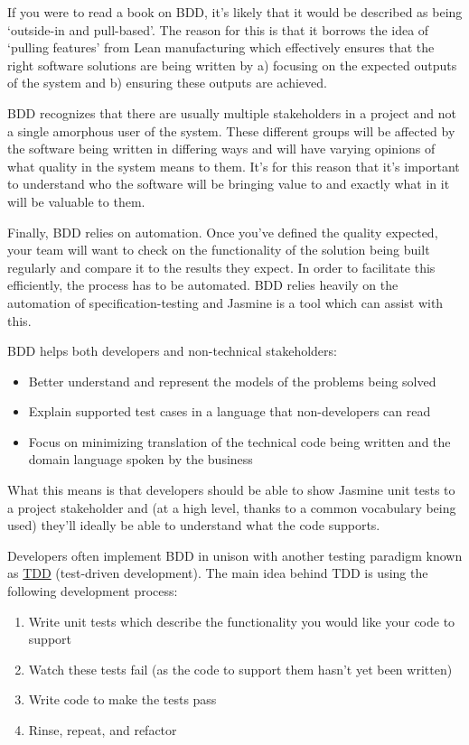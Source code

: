 \documentclass[9pt]{book}
\begin{document}
If you were to read a book on BDD, it's likely that it would be
described as being `outside-in and pull-based'. The reason for this is
that it borrows the idea of `pulling features' from Lean manufacturing
which effectively ensures that the right software solutions are being
written by a) focusing on the expected outputs of the system and b)
ensuring these outputs are achieved.

BDD recognizes that there are usually multiple stakeholders in a project
and not a single amorphous user of the system. These different groups
will be affected by the software being written in differing ways and
will have varying opinions of what quality in the system means to them.
It's for this reason that it's important to understand who the software
will be bringing value to and exactly what in it will be valuable to
them.

Finally, BDD relies on automation. Once you've defined the quality
expected, your team will want to check on the functionality of the
solution being built regularly and compare it to the results they
expect. In order to facilitate this efficiently, the process has to be
automated. BDD relies heavily on the automation of specification-testing
and Jasmine is a tool which can assist with this.

BDD helps both developers and non-technical stakeholders:

\begin{itemize}
\itemsep1pt\parskip0pt
\item
  Better understand and represent the models of the problems being
  solved
\item
  Explain supported test cases in a language that non-developers can
  read
\item
  Focus on minimizing translation of the technical code being written
  and the domain language spoken by the business
\end{itemize}

What this means is that developers should be able to show Jasmine unit
tests to a project stakeholder and (at a high level, thanks to a common
vocabulary being used) they'll ideally be able to understand what the
code supports.

Developers often implement BDD in unison with another testing paradigm
known as
\href{http://en.wikipedia.org/wiki/Test-driven_development}{TDD}
(test-driven development). The main idea behind TDD is using the
following development process:

\begin{enumerate}
\def\labelenumi{\arabic{enumi}.}
\itemsep1pt\parskip0pt
\item
  Write unit tests which describe the functionality you would like your
  code to support
\item
  Watch these tests fail (as the code to support them hasn't yet been
  written)
\item
  Write code to make the tests pass
\item
  Rinse, repeat, and refactor
\end{enumerate}
\end{document}

